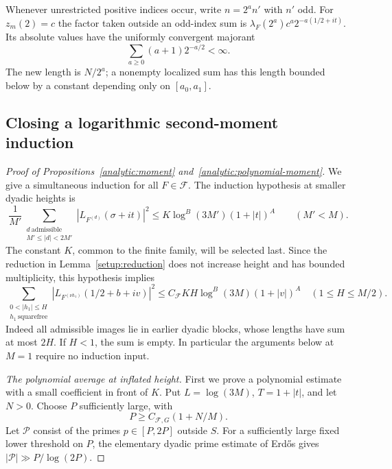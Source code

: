 Whenever unrestricted positive indices occur, write $n=2^a n'$ with
$n'$ odd. For $z_m(2)=c$ the factor taken outside an odd-index sum is
$\lambda_F(2^a)c^a2^{-a(1/2+it)}$. Its absolute values have the
uniformly convergent majorant
\begin{equation}\label{analytic:two-sum}
 \sum_{a\geq0}(a+1)2^{-a/2}<\infty.
\end{equation}
The new length is $N/2^a$; a nonempty localized sum has this length
bounded below by a constant depending only on $[a_0,a_1]$.

\subsection{Closing a logarithmic second-moment induction}

\begin{proof}[Proof of Propositions~\ref{analytic:moment} and~\ref{analytic:polynomial-moment}]
We give a simultaneous induction for all $F\in\mathcal F$.
The induction hypothesis at smaller dyadic heights is
\begin{equation}\label{analytic:induction-hypothesis}
 \frac1{M'}\sum_{\substack{d\ \mathrm{admissible}\\M'\leq|d|<2M'}}
 |L_{F^{(d)}}(\sigma+it)|^2
 \leq K\log^B(3M')(1+|t|)^A \qquad(M'<M).
\end{equation}
The constant $K$, common to the finite family, will be selected last.
Since the reduction in Lemma~\ref{setup:reduction} does not increase
height and has bounded multiplicity, this hypothesis implies
\begin{equation}\label{analytic:inductive-prefix}
 \sum_{\substack{0<|h_1|\leq H\\h_1\ \mathrm{squarefree}}}
 |L_{F^{(\nu h_1)}}(1/2+b+iv)|^2
 \leq C_{\mathcal F}KH\log^B(3M)(1+|v|)^A
 \quad(1\leq H\leq M/2).
\end{equation}
Indeed all admissible images lie in earlier dyadic blocks, whose
lengths have sum at most $2H$. If $H<1$, the sum is empty. In
particular the arguments below at $M=1$ require no induction input.

\smallskip
\noindent\emph{The polynomial average at inflated height.}
First we prove a polynomial estimate with a small coefficient in
front of $K$. Put $L=\log(3M)$, $T=1+|t|$, and let $N>0$.
Choose $P$ sufficiently large, with
\begin{equation}\label{analytic:inflation-condition}
 P\geq C_{\mathcal F,G}(1+N/M).
\end{equation}
Let $\mathcal P$ consist of the primes $p\in[P,2P]$ outside $S$.
For a sufficiently large fixed lower threshold on $P$, the elementary
dyadic prime estimate of Erd\H{o}s \cite[\S6, equation~(10)]{Erdos1932}
gives $|\mathcal P|\gg P/\log(2P)$.


\end{proof}
